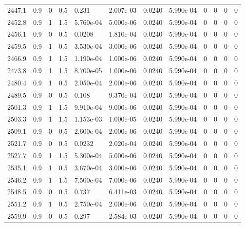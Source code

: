 \documentclass[preview]{standalone}
\begin{document}
{{{{{{{{{{{\begin{tabular}{L{1.2cm}C{1.2cm} C{0.3cm}C{0.5cm} C{1.4cm}C{1.4cm} C{1.4cm}C{1.4cm} C{1.6cm}C{1.6cm} C{1.6cm}C{1.6cm}}
  2447.1  &   0.9  & 0     & 0.5 &  0.231  & 2.007e-03  &  0.0240&   5.990e-04& 0 & 0   &  0 & 0  \\ 
  2452.8  &   0.9  & 1     & 1.5 &  5.760e-04  & 5.000e-06  &  0.0240&   5.990e-04& 0 & 0   &  0 & 0  \\ 
  2456.1  &   0.9  & 0     & 0.5 &  0.0208  & 1.810e-04  &  0.0240&   5.990e-04& 0 & 0   &  0 & 0  \\ 
  2459.5  &   0.9  & 1     & 0.5 &  3.530e-04  & 3.000e-06  &  0.0240&   5.990e-04& 0 & 0   &  0 & 0  \\ 
  2466.9  &   0.9  & 1     & 1.5 &  1.190e-04  & 1.000e-06  &  0.0240&   5.990e-04& 0 & 0   &  0 & 0  \\ 
  2473.8  &   0.9  & 1     & 1.5 &  8.700e-05  & 1.000e-06  &  0.0240&   5.990e-04& 0 & 0   &  0 & 0  \\ 
  2480.4  &   0.9  & 1     & 0.5 &  2.050e-04  & 2.000e-06  &  0.0240&   5.990e-04& 0 & 0   &  0 & 0  \\ 
  2489.5  &   0.9  & 0     & 0.5 &  0.108  & 9.370e-04  &  0.0240&   5.990e-04& 0 & 0   &  0 & 0  \\ 
  2501.3  &   0.9  & 1     & 1.5 &  9.910e-04  & 9.000e-06  &  0.0240&   5.990e-04& 0 & 0   &  0 & 0  \\ 
  2503.3  &   0.9  & 1     & 1.5 &  1.153e-03  & 1.000e-05  &  0.0240&   5.990e-04& 0 & 0   &  0 & 0  \\ 
  2509.1  &   0.9  & 0     & 0.5 &  2.600e-04  & 2.000e-06  &  0.0240&   5.990e-04& 0 & 0   &  0 & 0  \\ 
  2521.7  &   0.9  & 0     & 0.5 &  0.0232  & 2.020e-04  &  0.0240&   5.990e-04& 0 & 0   &  0 & 0  \\ 
  2527.7  &   0.9  & 1     & 1.5 &  5.300e-04  & 5.000e-06  &  0.0240&   5.990e-04& 0 & 0   &  0 & 0  \\ 
  2535.1  &   0.9  & 1     & 0.5 &  3.670e-04  & 3.000e-06  &  0.0240&   5.990e-04& 0 & 0   &  0 & 0  \\ 
  2546.2  &   0.9  & 1     & 1.5 &  7.500e-04  & 7.000e-06  &  0.0240&   5.990e-04& 0 & 0   &  0 & 0  \\ 
  2548.5  &   0.9  & 0     & 0.5 &  0.737  & 6.411e-03  &  0.0240&   5.990e-04& 0 & 0   &  0 & 0  \\ 
  2551.2  &   0.9  & 1     & 0.5 &  2.750e-04  & 2.000e-06  &  0.0240&   5.990e-04& 0 & 0   &  0 & 0  \\ 
  2559.9  &   0.9  & 0     & 0.5 &  0.297  & 2.584e-03  &  0.0240&   5.990e-04& 0 & 0   &  0 & 0  \\ 

\end{tabular}}}}}}}}}}}}
\end{document}
